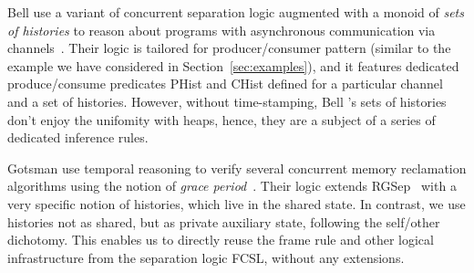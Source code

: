 Bell \etal use a variant of concurrent separation logic augmented with
a monoid of \emph{sets of histories} to reason about programs with
asynchronous communication via channels~\cite{Bell-al:SAS10}. Their
logic is tailored for producer/consumer pattern (similar to the
example we have considered in Section~\ref{sec:examples}), and it
features dedicated produce/consume predicates PHist and CHist defined
for a particular channel and a set of histories. However, without
time-stamping, Bell \etal's sets of histories don't enjoy the
unifomity with heaps, hence, they are a subject of a series of
dedicated inference rules.

Gotsman \etal use temporal reasoning to verify several concurrent
memory reclamation algorithms using the notion of \emph{grace
  period}~\cite{Gotsman-al:ESOP13}. Their logic extends
RGSep~\cite{Vafeiadis-Parkinson:CONCUR07} with a very specific notion
of histories, which live in the shared state. In contrast, we use
histories not as shared, but as private auxiliary state, following the
self/other dichotomy. This enables us to directly reuse the frame
rule and other logical infrastructure from the separation logic FCSL,
without any extensions.


